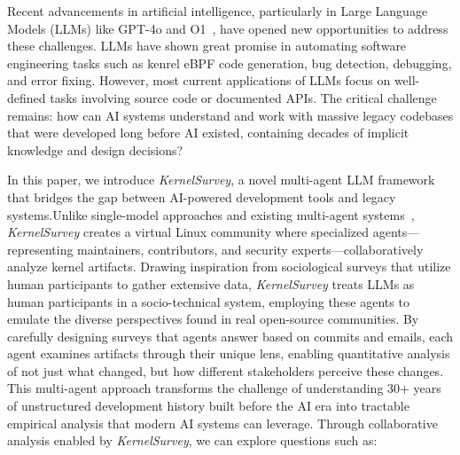 \documentclass[sigconf,review,anonymous]{acmart}
\newcommand{\sys}{\textit{KernelSurvey}\xspace}
\begin{document}
Recent advancements in artificial intelligence, particularly in Large Language Models (LLMs) like GPT-4o\cite{gpt4o} and O1~\cite{o1}, have opened new opportunities to address these challenges. LLMs have shown great promise in automating software engineering tasks such as kenrel eBPF code generation\cite{zheng2024kgent}, bug detection\cite{li2024enhancing}, debugging\cite{chen2023teaching}, and error fixing\cite{deligiannis2023fixing}. However, most current applications of LLMs focus on well-defined tasks involving source code or documented APIs. The critical challenge remains: how can AI systems understand and work with massive legacy codebases that were developed long before AI existed, containing decades of implicit knowledge and design decisions?

In this paper, we introduce \sys, a novel multi-agent LLM framework that bridges the gap between AI-powered development tools and legacy systems.Unlike single-model approaches and existing multi-agent systems~\cite{lmase2024,agent4se2024},  \sys creates a virtual Linux community where specialized agents—representing maintainers, contributors, and security experts—collaboratively analyze kernel artifacts. Drawing inspiration from sociological surveys that utilize human participants to gather extensive data, \sys treats LLMs as human participants in a socio-technical system, employing these agents to emulate the diverse perspectives found in real open-source communities. By carefully designing surveys that agents answer based on commits and emails\cite{linux,tan2019communicate,schneider2016differentiating}, each agent examines artifacts through their unique lens, enabling quantitative analysis of not just what changed, but how different stakeholders perceive these changes. This multi-agent approach transforms the challenge of understanding 30+ years of unstructured development history built before the AI era into tractable empirical analysis that modern AI systems can leverage. Through collaborative analysis enabled by \sys, we can explore questions such as:
\end{document}
